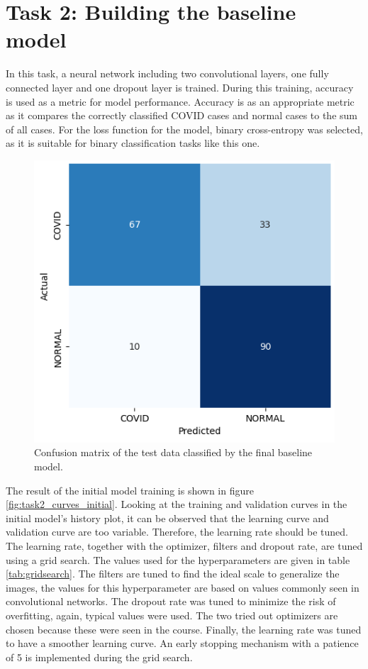 \documentclass[conference]{IEEEtran}
\begin{document}
\section{Task 2: Building the baseline model}\label{sec:task_2}


In this task, a neural network including two convolutional layers, one fully connected layer and one dropout layer is trained. During this training, accuracy is used as a metric for model performance. Accuracy is as an appropriate metric as it compares the correctly classified COVID cases and normal cases to the sum of all cases.  For the loss function for the model, binary cross-entropy was selected, as it is suitable for binary classification tasks like this one.


\begin{figure}[h!] \centering 						\includegraphics[width=0.9\columnwidth]{fig_task2_confusionmatrix.png} 
	\caption{Confusion matrix of the test data classified by the final baseline model.} 
	\label{fig:task2_confusionmatrix} 
\end{figure}
The result of the initial model training is shown in figure \ref{fig:task2_curves_initial}. Looking at the training and validation curves in the initial model's history plot, it can be observed that the learning curve and validation curve are too variable. Therefore, the learning rate should be tuned. The learning rate, together with the optimizer, filters and dropout rate, are tuned using a grid search. The values used for the hyperparameters are given in table \ref{tab:gridsearch}. The filters are tuned to find the ideal scale to generalize the images, the values for this hyperparameter are based on values commonly seen in convolutional networks. The dropout rate was tuned to minimize the risk of overfitting, again, typical values were used. The two tried out optimizers are chosen because these were seen in the course. Finally, the learning rate was tuned to have a smoother learning curve. An early stopping mechanism with a patience of 5 is implemented during the grid search. 
\end{document}
